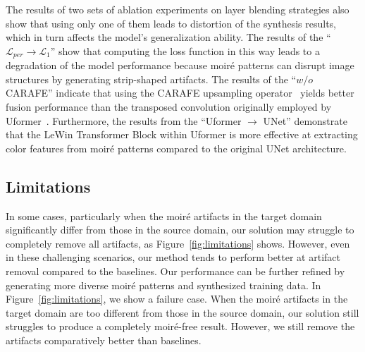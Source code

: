 

The results of two sets of ablation experiments on layer blending strategies also show that using only one of them leads to distortion of the synthesis results, which in turn affects the model's generalization ability.
The results of the ``$\mathcal{L}_{per}\rightarrow\mathcal{L}_1$'' show that computing the loss function in this way leads to a degradation of the model performance because moiré patterns can disrupt image structures by generating strip-shaped artifacts. 
The results of the ``$w/o$ CARAFE'' indicate that using the CARAFE upsampling operator~\cite{wang2019carafe} yields better fusion performance than the transposed convolution originally employed by Uformer~\cite{Wang2022Uformer}.
Furthermore, the results from the “Uformer $\rightarrow$ UNet” demonstrate that the LeWin Transformer Block within Uformer is more effective at extracting color features from moiré patterns compared to the original UNet architecture.


\subsection{Limitations}

In some cases, particularly when the moiré artifacts in the target domain significantly differ from those in the source domain, our solution may struggle to completely remove all artifacts, as Figure~\ref{fig:limitations} shows. However, even in these challenging scenarios, our method tends to perform better at artifact removal compared to the baselines. Our performance can be further refined by generating more diverse moiré patterns and synthesized training data.
In Figure~\ref{fig:limitations}, we show a failure case. When the moiré artifacts in the target domain are too different from those in the source domain, our solution still struggles to produce a completely moiré-free result. However, we still remove the artifacts comparatively better than baselines.


